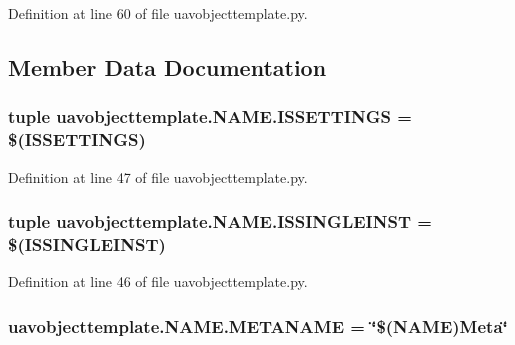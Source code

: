 Definition at line 60 of file uavobjecttemplate.\-py.



\subsection{Member Data Documentation}
\hypertarget{classuavobjecttemplate_1_1_n_a_m_e_a96554299c9ee77ca7b85b9bce0cf5e15}{
\subsubsection[{I\-S\-S\-E\-T\-T\-I\-N\-G\-S}]{\setlength{\rightskip}{0pt plus 5cm}tuple uavobjecttemplate.\-N\-A\-M\-E.\-I\-S\-S\-E\-T\-T\-I\-N\-G\-S = \$(I\-S\-S\-E\-T\-T\-I\-N\-G\-S)\hspace{0.3cm}{\ttfamily [static]}}}\label{classuavobjecttemplate_1_1_n_a_m_e_a96554299c9ee77ca7b85b9bce0cf5e15}


Definition at line 47 of file uavobjecttemplate.\-py.

\hypertarget{classuavobjecttemplate_1_1_n_a_m_e_afc79fbb87532580147383d40c5d7eb31}{
\subsubsection[{I\-S\-S\-I\-N\-G\-L\-E\-I\-N\-S\-T}]{\setlength{\rightskip}{0pt plus 5cm}tuple uavobjecttemplate.\-N\-A\-M\-E.\-I\-S\-S\-I\-N\-G\-L\-E\-I\-N\-S\-T = \$(I\-S\-S\-I\-N\-G\-L\-E\-I\-N\-S\-T)\hspace{0.3cm}{\ttfamily [static]}}}\label{classuavobjecttemplate_1_1_n_a_m_e_afc79fbb87532580147383d40c5d7eb31}


Definition at line 46 of file uavobjecttemplate.\-py.

\hypertarget{classuavobjecttemplate_1_1_n_a_m_e_a73916d6c625f956ee007d7b1e09ff097}{
\subsubsection[{M\-E\-T\-A\-N\-A\-M\-E}]{ uavobjecttemplate.\-N\-A\-M\-E.\-M\-E\-T\-A\-N\-A\-M\-E = \char`\"{}\$(N\-A\-M\-E)Meta\char`\"{}\hspace{0.3cm}{\ttfamily [static]}}}\label{classuavobjecttemplate_1_1_n_a_m_e_a73916d6c625f956ee007d7b1e09ff097}



